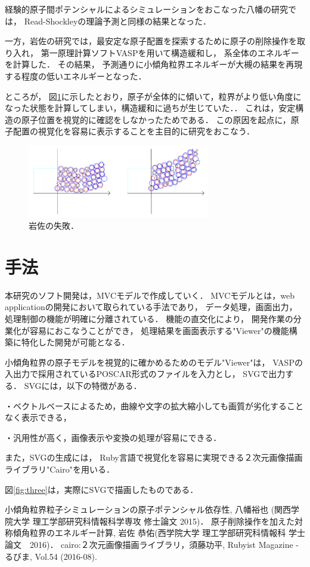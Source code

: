 \documentclass[a4j,twocolumn]{jsarticle}
\begin{document}
経験的原子間ポテンシャルによるシミュレーションをおこなった八幡の研究では，
Read-Shockleyの理論予測と同様の結果となった\cite{yahata}．

一方，岩佐の研究では，最安定な原子配置を探索するために原子の削除操作を取り入れ，
第一原理計算ソフトVASPを用いて構造緩和し，
系全体のエネルギーを計算した．
その結果，
予測通りに小傾角粒界エネルギーが大槻の結果を再現する程度の低いエネルギーとなった\cite{iwasa}．

ところが，
図\ref{fig:two}に示したとおり，原子が全体的に傾いて，粒界がより低い角度になった状態を計算してしまい，構造緩和に過ちが生じていた．．
これは，安定構造の原子位置を視覚的に確認をしなかったためである．
この原因を起点に，原子配置の視覚化を容易に表示することを主目的に研究をおこなう．
\begin{figure}[h]
\begin{center}
   \includegraphics[width=80mm]{./Iwasa.png} 
     \caption{岩佐の失敗．}
  \label{fig:two}
\end{center}
\end{figure}



\section{手法}
本研究のソフト開発は，MVCモデルで作成していく．
MVCモデルとは，web applicationの開発において取られている手法であり，
データ処理，画面出力，処理制御の機能が明確に分離されている．
機能の直交化により，
開発作業の分業化が容易におこなうことができ， 
処理結果を画面表示する"Viewer"の機能構築に特化した開発が可能となる．

小傾角粒界の原子モデルを視覚的に確かめるためのモデル"Viewer"は，
VASPの入出力で採用されているPOSCAR形式のファイルを入力とし，
SVGで出力する．
SVGには，以下の特徴がある．


・ベクトルベースによるため，曲線や文字の拡大縮小しても画質が劣化することなく表示できる，

・汎用性が高く，画像表示や変換の処理が容易にできる．


また，SVGの生成には，
Ruby言語で視覚化を容易に実現できる２次元画像描画ライブラリ"Cairo"を用いる\cite{sudoh}．

図\ref{fig:three}は，実際にSVGで描画したものである．



\begin{thebibliography}{9}
 小傾角粒界粒子シミュレーションの原子ポテンシャル依存性, 八幡裕也 (関西学院大学 理工学部研究科情報科学専攻 修士論文 2015)．
 原子削除操作を加えた対称傾角粒界のエネルギー計算, 岩佐 恭佑(西学院大学 理工学部研究科情報科 学士論文　2016)． 
 cairo:２次元画像描画ライブラリ，須藤功平, Rubyist Magazine - るびま, Vol.54 (2016-08).
\end{thebibliography}
\end{document}
